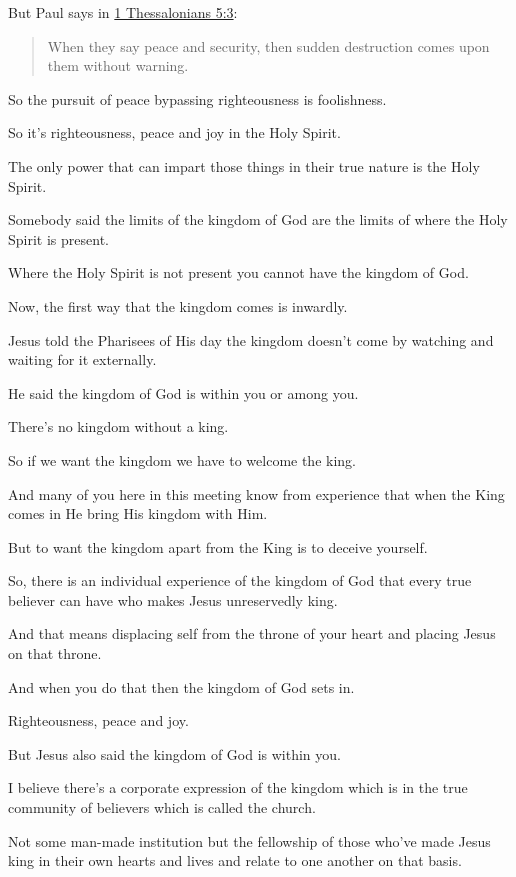 \documentclass[11pt]{article}
\begin{document}
But Paul says in \href{https://www.biblegateway.com/passage/?search=1\%20Thessalonians\%205\%3A3\&version=ESV}{1 Thessalonians 5:3}:

\begin{quote}
When they say peace and security, then sudden
destruction comes upon them without warning.
\end{quote}

So the pursuit of peace bypassing
righteousness is foolishness.

So it's righteousness, peace and joy in the
Holy Spirit.

The only power that can impart those things in
their true nature is the Holy Spirit.

Somebody said the limits of the kingdom of God
are the limits of where the Holy Spirit is
present.

Where the Holy Spirit is not present you
cannot have the kingdom of God.

Now, the first way that the kingdom comes is
inwardly.

Jesus told the Pharisees of His day the
kingdom doesn't come by watching and waiting
for it externally.

He said the kingdom of God is within you or
among you.

There's no kingdom without a king.

So if we want the kingdom we have to welcome
the king.

And many of you here in this meeting know from
experience that when the King comes in He
bring His kingdom with Him.

But to want the kingdom apart from the King is
to deceive yourself.

So, there is an individual experience of the
kingdom of God that every true believer can
have who makes Jesus unreservedly king.

And that means displacing self from the throne
of your heart and placing Jesus on that
throne.

And when you do that then the kingdom of God
sets in.

Righteousness, peace and joy.

But Jesus also said the kingdom of God is
within you.

I believe there's a corporate expression of
the kingdom which is in the true community of
believers which is called the church.

Not some man-made institution but the
fellowship of those who've made Jesus king in
their own hearts and lives and relate to one
another on that basis.
\end{document}
